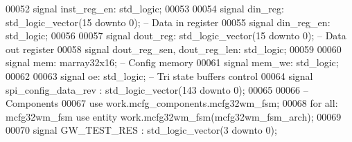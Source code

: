 \begin{DoxyCode}
00052    \textcolor{keywordflow}{signal} \textcolor{vhdlchar}{inst_reg_en}\textcolor{vhdlchar}{:} \textcolor{comment}{std\_logic};
00053    
00054    \textcolor{keywordflow}{signal} \textcolor{vhdlchar}{din_reg}\textcolor{vhdlchar}{:} \textcolor{comment}{std\_logic\_vector}\textcolor{vhdlchar}{(}\textcolor{vhdllogic}{}\textcolor{vhdllogic}{15} \textcolor{keywordflow}{downto} \textcolor{vhdllogic}{}\textcolor{vhdllogic}{0}\textcolor{vhdlchar}{)};\textcolor{keyword}{     -- Data in register}
00055    \textcolor{keywordflow}{signal} \textcolor{vhdlchar}{din_reg_en}\textcolor{vhdlchar}{:} \textcolor{comment}{std\_logic};
00056    
00057    \textcolor{keywordflow}{signal} \textcolor{vhdlchar}{dout_reg}\textcolor{vhdlchar}{:} \textcolor{comment}{std\_logic\_vector}\textcolor{vhdlchar}{(}\textcolor{vhdllogic}{}\textcolor{vhdllogic}{15} \textcolor{keywordflow}{downto} \textcolor{vhdllogic}{}\textcolor{vhdllogic}{0}\textcolor{vhdlchar}{)};\textcolor{keyword}{    -- Data out register}
00058    \textcolor{keywordflow}{signal} \textcolor{vhdlchar}{dout_reg_sen}\textcolor{vhdlchar}{,} \textcolor{vhdlchar}{dout_reg_len}\textcolor{vhdlchar}{:} \textcolor{comment}{std\_logic};
00059    
00060    \textcolor{keywordflow}{signal} \textcolor{vhdlchar}{mem}\textcolor{vhdlchar}{:} \textcolor{vhdlchar}{marray32x16};\textcolor{keyword}{                           -- Config memory}
00061    \textcolor{keywordflow}{signal} \textcolor{vhdlchar}{mem_we}\textcolor{vhdlchar}{:} \textcolor{comment}{std\_logic};
00062    
00063    \textcolor{keywordflow}{signal} \textcolor{vhdlchar}{oe}\textcolor{vhdlchar}{:} \textcolor{comment}{std\_logic};\textcolor{keyword}{                              -- Tri state buffers control}
00064    \textcolor{keywordflow}{signal} \textcolor{vhdlchar}{spi_config_data_rev}   \textcolor{vhdlchar}{:} \textcolor{comment}{std\_logic\_vector}\textcolor{vhdlchar}{(}\textcolor{vhdllogic}{}\textcolor{vhdllogic}{143} \textcolor{keywordflow}{downto} \textcolor{vhdllogic}{}\textcolor{vhdllogic}{0}\textcolor{vhdlchar}{)};
00065    
00066 \textcolor{keyword}{   -- Components}
00067 \textcolor{vhdlkeyword}{   use }work.mcfg_components.mcfg32wm\_fsm;
00068    \textcolor{keywordflow}{for} \textcolor{keywordflow}{all}\textcolor{vhdlchar}{:} \textcolor{vhdlchar}{mcfg32wm\_fsm} \textcolor{keywordflow}{use} \textcolor{keywordflow}{entity} \textcolor{vhdlchar}{work}\textcolor{vhdlchar}{.}\textcolor{vhdlchar}{mcfg32wm\_fsm}\textcolor{vhdlchar}{(}\textcolor{vhdlchar}{mcfg32wm\_fsm\_arch}\textcolor{vhdlchar}{)};
00069    
00070    \textcolor{keywordflow}{signal} \textcolor{vhdlchar}{GW_TEST_RES} \textcolor{vhdlchar}{:} \textcolor{comment}{std\_logic\_vector}\textcolor{vhdlchar}{(}\textcolor{vhdllogic}{}\textcolor{vhdllogic}{3} \textcolor{keywordflow}{downto} \textcolor{vhdllogic}{}\textcolor{vhdllogic}{0}\textcolor{vhdlchar}{)};

\end{DoxyCode}

